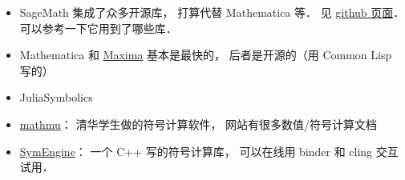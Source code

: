 
\begin{issues}
\issueDraft
\end{issues}

\begin{itemize}
\item SageMath 集成了众多开源库， 打算代替 Mathematica 等． 见 \href{https://github.com/sagemath/sage/}{github 页面}． 可以参考一下它用到了哪些库．
\item Mathematica 和 \href{https://maxima.sourceforge.io/}{Maxima} 基本是最快的， 后者是开源的（用 Common Lisp 写的）
\item JuliaSymbolics
\item \href{http://mathmu.github.io/MTCAS/RecentChanges.html}{mathmu}： 清华学生做的符号计算软件， 网站有很多数值/符号计算文档
\item \href{https://github.com/symengine/symengine}{SymEngine}： 一个 C++ 写的符号计算库， 可以在线用 binder 和 cling 交互试用．
\end{itemize}
